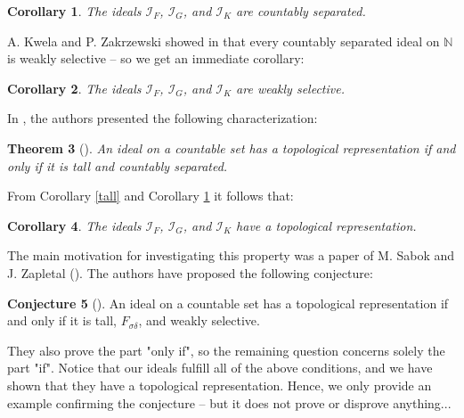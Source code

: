 \documentclass{amsart}
\newtheorem{thm}{Theorem}[section]
\newtheorem{cor}[thm]{Corollary}
\theoremstyle{definition}
\theoremstyle{definition}
\newtheorem{conj}[thm]{Conjecture}
\newcommand{\N}{{\mathbb N}}
\newcommand{\I}{\mathcal I}
\begin{document}
\begin{cor} \label{cs}
The ideals $\I_F$, $\I_G$, and $\I_K$ are countably separated.
\end{cor}


A. Kwela and P. Zakrzewski showed in \cite[Proposition 4.3]{KwelaZak} that every countably separated ideal on $\N$ is weakly selective -- so we get an immediate corollary:

\begin{cor}
The ideals $\I_F$, $\I_G$, and $\I_K$ are weakly selective.
\end{cor}


In \cite{Adas}, the authors presented the following characterization: 

\begin{thm}[{\cite[Theorem 1.1]{Adas}}]
An ideal on a countable set has a topological representation if and only if it is tall and countably separated.
\end{thm}


From Corollary \ref{tall} and Corollary \ref{cs} it follows that:

\begin{cor}
The ideals $\I_F$, $\I_G$, and $\I_K$ have a topological representation.
\end{cor}

The main motivation for investigating this property was a paper of M. Sabok and J. Zapletal (\cite{Sabok}). The authors have proposed the following conjecture:
\begin{conj}[\cite{Sabok}]
An ideal on a countable set has a topological representation if and only if it is tall, $F_{\sigma\delta}$, and weakly selective. 
\end{conj}

They also prove the part "only if", so the remaining question concerns solely the part "if".
Notice that our ideals fulfill all of the above conditions, and we have shown that they have a topological representation. Hence, we only provide an example confirming the conjecture -- but it does not prove or disprove anything...\\
\end{document}
